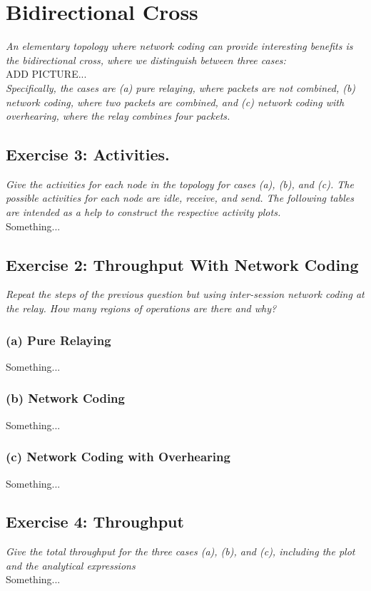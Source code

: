 \section{Bidirectional Cross}
\textit{An elementary topology where network coding can provide interesting benefits is the bidirectional cross, where we distinguish between three cases:}\\

ADD PICTURE...\\

\textit{Specifically, the cases are (a) pure relaying, where packets are not combined, (b) network coding, where two packets are combined, and (c) network coding with overhearing, where the relay combines four packets.}


\subsection{Exercise 3: Activities.}
\textit{Give the activities for each node in the topology for cases (a), (b), and (c). The possible activities for each node are idle, receive, and send. The following tables are intended as a help to construct the respective activity plots.}\\

Something...

\subsection{Exercise 2: Throughput With Network Coding}
\textit{Repeat the steps of the previous question but using inter-session network coding at the relay. How many regions of operations are there and why?}

\subsubsection{(a) Pure Relaying}
Something...


\subsubsection{(b) Network Coding}
Something...

\subsubsection{(c) Network Coding with Overhearing}
Something...

\subsection{Exercise 4: Throughput}
\textit{Give the total throughput for the three cases (a), (b), and (c), including the plot and the analytical expressions}\\

Something...